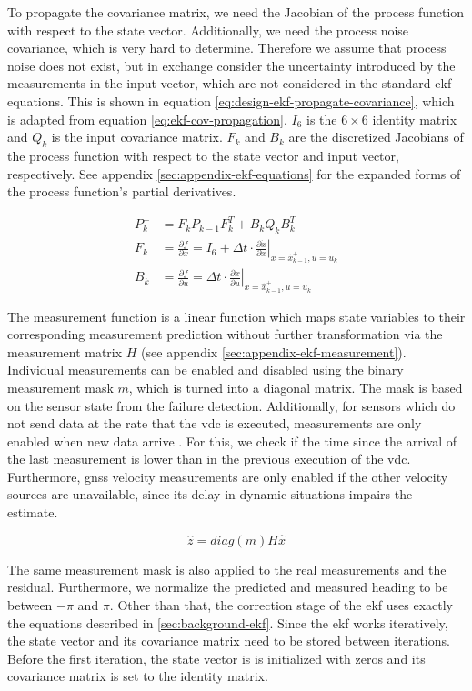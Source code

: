To propagate the covariance matrix, we need the Jacobian of the process function with respect to the state vector. Additionally, we need the process noise covariance, which is very hard to determine. Therefore we assume that process noise does not exist, but in exchange consider the uncertainty introduced by the measurements in the input vector, which are not considered in the standard \gls{ekf} equations. This is shown in equation \ref{eq:design-ekf-propagate-covariance}, which is adapted from equation \ref{eq:ekf-cov-propagation}. $I_6$ is the $6 \times 6$ identity matrix and $Q_k$ is the input covariance matrix. $F_k$ and $B_k$ are the discretized Jacobians of the process function with respect to the state vector and input vector, respectively. See appendix \ref{sec:appendix-ekf-equations} for the expanded forms of the process function's partial derivatives.

\begin{subequations}\label{eq:design-ekf-propagate-covariance}
\begin{alignat}{2}%
P_k^- &= F_k P_{k-1} F_k^T + B_k Q_k B_k^T \\%
F_k &= \frac{\partial f}{\partial x} = I_6 + \Delta t \cdot \left. \frac{\partial \dot{x}}{\partial x} \right|_{x = \hat{x}_{k-1}^+, u=u_k} \\%
B_k &= \frac{\partial f}{\partial u} = \Delta t \cdot \left. \frac{\partial \dot{x}}{\partial u} \right|_{x = \hat{x}_{k-1}^+, u=u_k}
\end{alignat}
\end{subequations}


The measurement function is a linear function which maps state variables to their corresponding measurement prediction without further transformation via the measurement matrix $H$ (see appendix \ref{sec:appendix-ekf-measurement}). Individual measurements can be enabled and disabled using the binary measurement mask $m$, which is turned into a diagonal matrix. The mask is based on the sensor state from the failure detection. Additionally, for sensors which do not send data at the rate that the \gls{vdc} is executed, measurements are only enabled when new data arrive
. For this, we check if the time since the arrival of the last measurement is lower than in the previous execution of the \gls{vdc}. Furthermore, \gls{gnss} velocity measurements are only enabled if the other velocity sources are unavailable, since its delay in dynamic situations impairs the estimate.

\begin{equation}
\hat{z} = \textit{diag}(m) H \hat{x}
\end{equation}

The same measurement mask is also applied to the real measurements and the residual. Furthermore, we normalize the predicted and measured heading to be between $-\pi$ and $\pi$. Other than that, the correction stage of the \gls{ekf} uses exactly the equations described in \ref{sec:background-ekf}. Since the \gls{ekf} works iteratively, the state vector and its covariance matrix need to be stored between iterations. Before the first iteration, the state vector is is initialized with zeros and its covariance matrix is set to the identity matrix.
